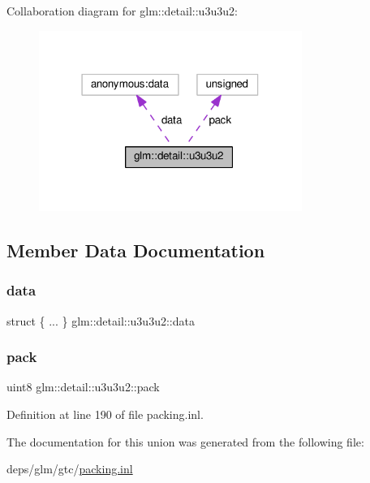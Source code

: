 Collaboration diagram for glm\+:\+:detail\+:\+:u3u3u2\+:
\nopagebreak
\begin{figure}[H]
\begin{center}
\leavevmode
\includegraphics[width=243pt]{d4/d6d/unionglm_1_1detail_1_1u3u3u2__coll__graph}
\end{center}
\end{figure}


\subsection{Member Data Documentation}
\mbox{\label{unionglm_1_1detail_1_1u3u3u2_a9fece3a4cafc2bb65fdbc1245b6787e8}} 
\subsubsection{\texorpdfstring{data}{data}}
{\footnotesize\ttfamily struct \{ ... \}   glm\+::detail\+::u3u3u2\+::data}

\mbox{\label{unionglm_1_1detail_1_1u3u3u2_aea48c2c7d1d3283f3c785daa33551351}} 
\subsubsection{\texorpdfstring{pack}{pack}}
{\footnotesize\ttfamily uint8 glm\+::detail\+::u3u3u2\+::pack}



Definition at line 190 of file packing.\+inl.



The documentation for this union was generated from the following file\+:\begin{DoxyCompactItemize}
\item 
deps/glm/gtc/\hyperlink{packing_8inl}{packing.\+inl}\end{DoxyCompactItemize}
